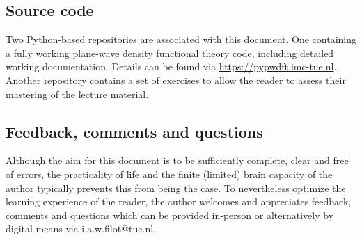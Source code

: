 %
%
%
\subsection{Source code}
Two Python-based repositories are associated with this document. One containing a fully working plane-wave density functional theory code, including detailed working documentation. Details can be found via \url{https://pypwdft.imc-tue.nl}. Another repository contains a set of exercises to allow the reader to assess their mastering of the lecture material.

%
%
%
\subsection{Feedback, comments and questions}

Although the aim for this document is to be sufficiently complete, clear and free of errors, the practicality of life and the finite (limited) brain capacity of the author typically prevents this from being the case. To nevertheless optimize the learning experience of the reader, the author welcomes and appreciates feedback, comments and questions which can be provided in-person or alternatively by digital means via i.a.w.filot@tue.nl.